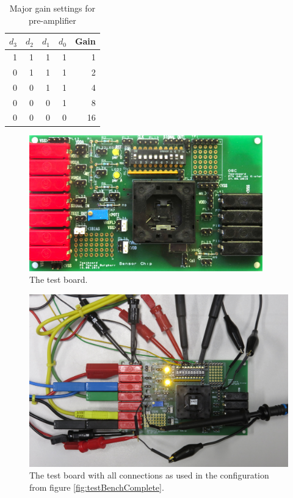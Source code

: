 \begin{table}
    \centering
    \caption{Major gain settings for pre-amplifier}
    \label{tab:gainSettings}
    \small
    \begin{tabular}{rrrrr}
        \toprule
        $d_3$ & $d_2$ & $d_1$ & $d_0$ & Gain \\
        \midrule
        1 & 1 & 1 & 1 & 1 \\
        0 & 1 & 1 & 1 & 2 \\
        0 & 0 & 1 & 1 & 4 \\
        0 & 0 & 0 & 1 & 8 \\
        0 & 0 & 0 & 0 & 16 \\
        \bottomrule
    \end{tabular}
\end{table}

\begin{figure}
    \centering
    \includegraphics[width=0.9\textwidth]{images/pcb/pcbOverview}
    \caption{The test board.}
    \label{fig:testBoard}
\end{figure}

\begin{figure}
    \includegraphics[width=\textwidth]{images/expSetup/testBoardConnected.jpeg}
    \caption{%
        The test board with all connections  as used in the configuration from
        figure \ref{fig:testBenchComplete}.%
    }
    \label{fig:testBenchConnected}
\end{figure}

